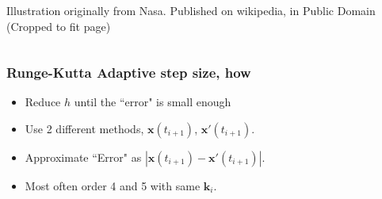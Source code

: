 \documentclass{beamer}
\begin{document}
\begin{frame}
\begin{columns}
\begin{column}{0.5\linewidth}
{{\color{gray} Illustration originally from Nasa. Published on wikipedia, in Public Domain (Cropped to fit page) }
}%


%

\end{column}
\end{columns}
\end{frame}


\begin{frame}
\frametitle{Runge-Kutta Adaptive step size, how}
\begin{itemize}
\item <1-> Reduce $h$ until the ``error" is small enough

\item <2-> Use 2 different methods, $\mathbf{x}(t_{i+1})$, $\mathbf{x}'(t_{i+1})$.

\item <3-> Approximate ``Error" as  $|\mathbf{x}(t_{i+1})-\mathbf{x}'(t_{i+1})|$.

\item <4-> Most often order 4 and 5 with same $\mathbf{k}_i$.
\end{itemize}
\end{frame}
\end{document}
